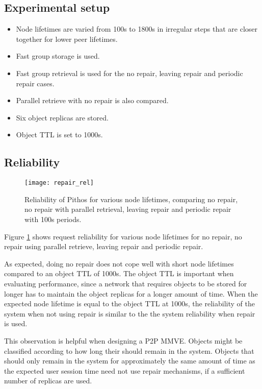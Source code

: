 \subsection{Experimental setup}

\begin{itemize}
\item Node lifetimes are varied from 100s to 1800s in irregular steps that are closer together for lower peer lifetimes.

\item Fast group storage is used.

\item Fast group retrieval is used for the no repair, leaving repair and periodic repair cases.

\item Parallel retrieve with no repair is also compared.

\item Six object replicas are stored.

\item Object TTL is set to 1000s.
\end{itemize}

\subsection{Reliability}

\begin{figure}[htbp]
 \centering
 \texttt{[image: repair\_rel]}
 \caption{Reliability of Pithos for various node lifetimes, comparing no repair, no repair with parallel retrieval, leaving repair and periodic repair with 100s periods.}
 \label{fig_repair_rel}
\end{figure}
%
Figure \ref{fig_repair_rel} shows request reliability for various node lifetimes for no repair, no repair using parallel retrieve, leaving repair and periodic repair.

As expected, doing no repair does not cope well with short node lifetimes compared to an object TTL of 1000s. The object TTL is important when evaluating performance, since a network that requires objects to be stored for longer has to maintain the object replicas for a longer amount of time. When the expected node lifetime is equal to the object TTL at 1000s, the reliability of the system when not using repair is similar to the the system reliability when repair is used.

This observation is helpful when designing a P2P MMVE. Objects might be classified according to how long their should remain in the system. Objects that should only remain in the system for approximately the same amount of time as the expected user session time need not use repair mechanisms, if a sufficient number of replicas are used.

